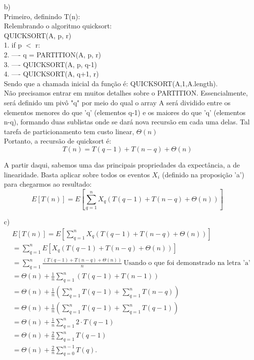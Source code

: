 \documentclass{article}
\begin{document}
b)\\
Primeiro, definindo T(n):\\
Relembrando o algoritmo quicksort:\\
QUICKSORT(A, p, r) \\
1. if p $<$ r: \\
2. ---- q = PARTITION(A, p, r) \\
3. ---- QUICKSORT(A, p, q-1) \\
4. ---- QUICKSORT(A, q+1, r) \\
Sendo que a chamada inicial da função é: QUICKSORT(A,1,A.length).\\
Não precisamos entrar em muitos detalhes sobre o PARTITION. Essencialmente, será definido um pivô "q" por meio do qual o array A será dividido entre os elementos menores do que 'q' (elementos q-1) e os maiores do que 'q' (elementos n-q), formando duas sublistas onde se dará nova recursão em cada uma delas. Tal tarefa de particionamento tem custo linear, $\Theta(n)$\\
Portanto, a recursão de quicksort é:\\
\begin{equation}
 T(n) = T(q-1)+T(n-q)+\Theta(n)
\end{equation}

A partir daqui, sabemos uma das principais propriedades da expectância, a de linearidade. Basta aplicar sobre todos os eventos $X_{i}$ (definido na proposição 'a') para chegarmos ao resultado:
\begin{equation}
E[T(n)]=E\left[\sum_{q=1}^{n}X_q(T(q-1)+T(n-q)+\Theta(n))\right]  
\end{equation}


c) 
\begin{align*}
&E[T(n)]=E\left[\sum_{q=1}^{n}X_q(T(q-1)+T(n-q)+\Theta(n))\right]   \\
&= \sum_{q=1}^n  E[X_q(T(q-1)+T(n-q)+\Theta(n))]\\
&= \sum_{q=1}^n \frac{(T(q-1)+T(n-q)+\Theta(n))}{n}\  \text{Usando o que foi demonstrado na letra 'a'} \\
&= \Theta(n)+\frac{1}{n} \sum_{q=1}^n(T(q-1)+T(n-1)) \\
&= \Theta(n)+\frac{1}{n} \left(\sum_{q=1}^n T(q-1)+\sum_{q=1}^nT(n-q) \right) \\
&= \Theta(n)+\frac{1}{n} \left(\sum_{q=1}^n T(q-1)+\sum_{q=1}^nT(q-1) \right) \\
&= \Theta(n)+\frac{1}{n} \sum_{q=1}^n 2\cdot T(q-1) \\
&= \Theta(n)+\frac{2}{n} \sum_{q=1}^n T(q-1) \\
&= \Theta(n)+\frac{2}{n} \sum_{q=0}^{n-1} T(q). \\
\end{align*}
\end{document}

